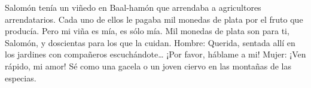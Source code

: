  Salomón tenía un viñedo en Baal-hamón que arrendaba a
agricultores arrendatarios. Cada uno de ellos le pagaba mil monedas de
plata por el fruto que producía.  Pero mi viña es mía, es
sólo mía. Mil monedas de plata son para ti, Salomón, y doscientas para
los que la cuidan. Hombre:  Querida, sentada allí en los
jardines con compañeros escuchándote\ldots{} ¡Por favor, háblame a mi!
Mujer:  ¡Ven rápido, mi amor! Sé como una gacela o un
joven ciervo en las montañas de las especias.
